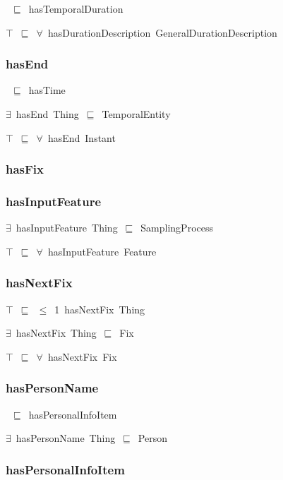 \documentclass{article}
\begin{document}
~\ensuremath{\sqsubseteq}~hasTemporalDuration

\ensuremath{\top}~\ensuremath{\sqsubseteq}~\ensuremath{\forall}~hasDurationDescription~GeneralDurationDescription

\subsubsection*{hasEnd}

~\ensuremath{\sqsubseteq}~hasTime

\ensuremath{\exists}~hasEnd~Thing~\ensuremath{\sqsubseteq}~TemporalEntity

\ensuremath{\top}~\ensuremath{\sqsubseteq}~\ensuremath{\forall}~hasEnd~Instant

\subsubsection*{hasFix}

\subsubsection*{hasInputFeature}

\ensuremath{\exists}~hasInputFeature~Thing~\ensuremath{\sqsubseteq}~SamplingProcess

\ensuremath{\top}~\ensuremath{\sqsubseteq}~\ensuremath{\forall}~hasInputFeature~Feature

\subsubsection*{hasNextFix}

\ensuremath{\top}~\ensuremath{\sqsubseteq}~\ensuremath{\leq}~1~hasNextFix~Thing

\ensuremath{\exists}~hasNextFix~Thing~\ensuremath{\sqsubseteq}~Fix

\ensuremath{\top}~\ensuremath{\sqsubseteq}~\ensuremath{\forall}~hasNextFix~Fix

\subsubsection*{hasPersonName}

~\ensuremath{\sqsubseteq}~hasPersonalInfoItem

\ensuremath{\exists}~hasPersonName~Thing~\ensuremath{\sqsubseteq}~Person

\subsubsection*{hasPersonalInfoItem}
\end{document}
